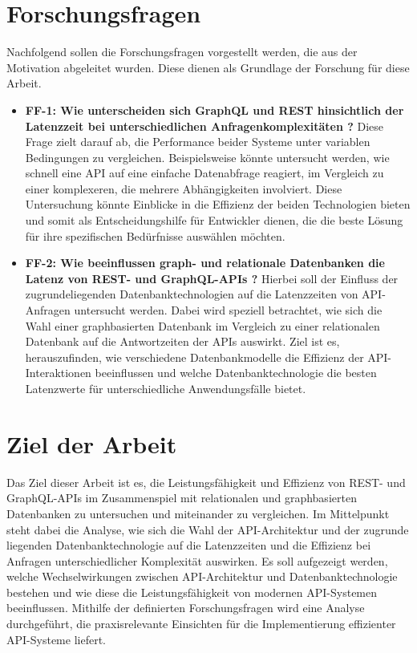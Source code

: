 \section{Forschungsfragen} %
\label{sec:forschungsfragen}
Nachfolgend sollen die Forschungsfragen vorgestellt werden, die aus der Motivation abgeleitet wurden. Diese dienen als Grundlage der Forschung für diese Arbeit.
\begin{itemize}
	\item \textbf{FF-1: Wie unterscheiden sich GraphQL und REST hinsichtlich der Latenzzeit bei unterschiedlichen Anfragenkomplexitäten ?}  Diese Frage zielt darauf ab, die Performance beider Systeme unter variablen Bedingungen zu vergleichen. Beispielsweise könnte untersucht werden, wie schnell eine API auf eine einfache Datenabfrage reagiert, im Vergleich zu einer komplexeren, die mehrere Abhängigkeiten involviert. Diese Untersuchung könnte Einblicke in die Effizienz der beiden Technologien bieten und somit als Entscheidungshilfe für Entwickler dienen, die die beste Lösung für ihre spezifischen Bedürfnisse auswählen möchten.
	\item \textbf{FF-2: Wie beeinflussen graph- und relationale Datenbanken die Latenz von REST- und GraphQL-APIs ?} Hierbei soll der Einfluss der zugrundeliegenden Datenbanktechnologien auf die Latenzzeiten von API-Anfragen untersucht werden. Dabei wird speziell betrachtet, wie sich die Wahl einer graphbasierten Datenbank im Vergleich zu einer relationalen Datenbank auf die Antwortzeiten der APIs auswirkt. Ziel ist es, herauszufinden, wie verschiedene Datenbankmodelle die Effizienz der API-Interaktionen beeinflussen und welche Datenbanktechnologie die besten Latenzwerte für unterschiedliche Anwendungsfälle bietet.
\end{itemize}
\section{Ziel der Arbeit} %
\label{sec:zielderarbeit}
Das Ziel dieser Arbeit ist es, die Leistungsfähigkeit und Effizienz von REST- und GraphQL-APIs im Zusammenspiel mit relationalen und graphbasierten Datenbanken zu untersuchen und miteinander zu vergleichen. Im Mittelpunkt steht dabei die Analyse, wie sich die Wahl der API-Architektur und der zugrunde liegenden Datenbanktechnologie auf die Latenzzeiten und die Effizienz bei Anfragen unterschiedlicher Komplexität auswirken. Es soll aufgezeigt werden, welche Wechselwirkungen zwischen API-Architektur und Datenbanktechnologie bestehen und wie diese die Leistungsfähigkeit von modernen API-Systemen beeinflussen. Mithilfe der definierten Forschungsfragen wird eine Analyse durchgeführt, die praxisrelevante Einsichten für die Implementierung effizienter API-Systeme liefert.
\newpage
